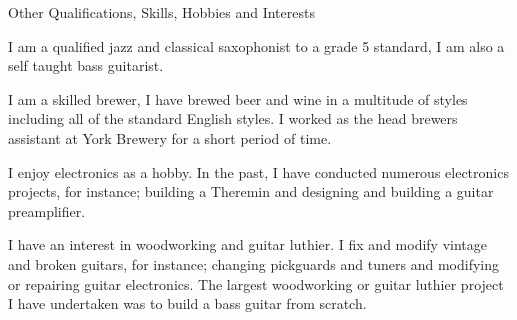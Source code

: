 \documentclass{cv} %
\begin{document}
\begin{rSection}{Other Qualifications, Skills, Hobbies and Interests}

\item I am a qualified jazz and classical saxophonist to a grade 5 standard, I am also a self taught  bass guitarist.

\item I am a skilled brewer, I have brewed beer and wine in a multitude of styles including all of the standard English styles. I worked as the head brewers assistant at York Brewery for a short period of time.

\item I enjoy electronics as a hobby. In the past, I have conducted numerous electronics projects, for instance; building a Theremin and designing and building a guitar preamplifier.

\item I have an interest in woodworking and guitar luthier. I fix and modify vintage and broken guitars, for instance; changing pickguards and tuners and modifying or repairing guitar electronics. The largest woodworking or guitar luthier project I have undertaken was to build a bass guitar from scratch.

\end{rSection}
\end{document}

